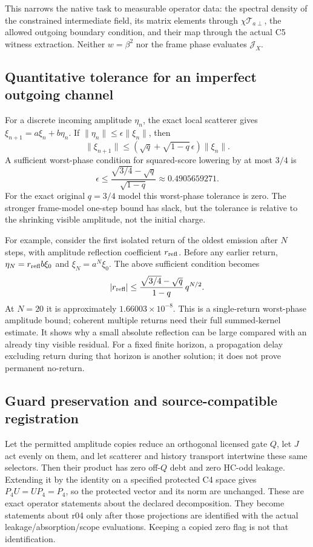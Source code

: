 \documentclass[11pt,a4paper]{article}
\begin{document}
This narrows the native task to measurable operator data:
the spectral density of the constrained intermediate field,
its matrix elements through $\chi\mathcal T_{a\perp}$,
the allowed outgoing boundary condition, and their map through
the actual C5 witness extraction. Neither $w=\beta^2$ nor the
frame phase evaluates $\mathcal J_X$.

\subsection{Quantitative tolerance for an imperfect outgoing channel}

For a discrete incoming amplitude $\eta_n$, the exact local
scatterer gives $\xi_{n+1}=a\xi_n+b\eta_n$. If
$\|\eta_n\|\le\epsilon\|\xi_n\|$, then
\[
 \|\xi_{n+1}\|\le
 (\sqrt q+\sqrt{1-q}\,\epsilon)\|\xi_n\|.
\]
A sufficient worst-phase condition for squared-score lowering
by at most $3/4$ is
\[
 \boxed{\displaystyle
 \epsilon\le\frac{\sqrt{3/4}-\sqrt q}{\sqrt{1-q}}
 \approx0.4905659271.}
\]
For the exact original $q=3/4$ model this worst-phase tolerance
is zero. The stronger frame-model one-step bound has slack, but
the tolerance is relative to the shrinking visible amplitude,
not the initial charge.

For example, consider the first isolated return of the oldest
emission after $N$ steps, with amplitude reflection coefficient
$r_{\rm refl}$. Before any earlier return,
$\eta_N=r_{\rm refl}b\xi_0$ and $\xi_N=a^N\xi_0$. The
above sufficient condition becomes
\[
 |r_{\rm refl}|\le
 \frac{\sqrt{3/4}-\sqrt q}{1-q}\,q^{N/2}.
\]
At $N=20$ it is approximately $1.66003\times10^{-8}$.
This is a single-return worst-phase amplitude bound; coherent
multiple returns need their full summed-kernel estimate. It shows
why a small absolute reflection can be large compared with an
already tiny visible residual. For a fixed finite horizon, a
propagation delay excluding return during that horizon is another
solution; it does not prove permanent no-return.

\subsection{Guard preservation and source-compatible registration}

Let the permitted amplitude copies reduce an orthogonal licensed
gate $Q$, let $J$ act evenly on them, and let scatterer and history
transport intertwine these same selectors. Then their product has
zero off-$Q$ debt and zero HC-odd leakage. Extending it by the
identity on a specified protected C4 space gives
$P_4U=UP_4=P_4$, so the protected vector and its norm are unchanged.
These are exact operator statements about the declared decomposition.
They become statements about r04 only after those projections are
identified with the actual leakage/absorption/scope evaluations.
Keeping a copied zero flag is not that identification.
\end{document}
